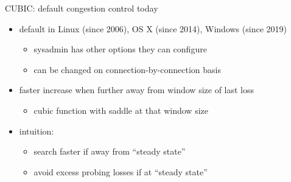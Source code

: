 \begin{frame}{CUBIC: default congestion control today}
    \begin{itemize}
    \item default in Linux (since 2006), OS X (since 2014), Windows (since 2019)
        \begin{itemize}
        \item sysadmin has other options they can configure
        \item can be changed on connection-by-connection basis
        \end{itemize}
    \vspace{.5cm}
    \item faster increase when further away from window size of last loss
        \begin{itemize}
        \item cubic function with saddle at that window size
        \end{itemize}
    \item intuition: 
        \begin{itemize}
        \item search faster if away from ``steady state''
        \item avoid excess probing losses if at ``steady state''
        \end{itemize}
    \end{itemize}
\end{frame}
